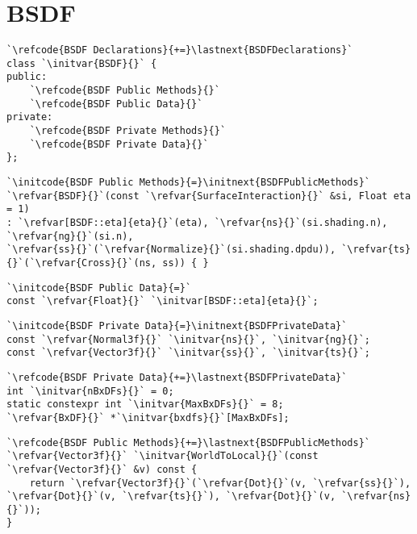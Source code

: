 \section{BSDF}\label{sec:BSDF}

\begin{lstlisting}
`\refcode{BSDF Declarations}{+=}\lastnext{BSDFDeclarations}`
class `\initvar{BSDF}{}` {
public:
    `\refcode{BSDF Public Methods}{}`
    `\refcode{BSDF Public Data}{}`
private:
    `\refcode{BSDF Private Methods}{}`
    `\refcode{BSDF Private Data}{}`
};
\end{lstlisting}

\begin{lstlisting}
`\initcode{BSDF Public Methods}{=}\initnext{BSDFPublicMethods}`
`\refvar{BSDF}{}`(const `\refvar{SurfaceInteraction}{}` &si, Float eta = 1)
: `\refvar[BSDF::eta]{eta}{}`(eta), `\refvar{ns}{}`(si.shading.n), `\refvar{ng}{}`(si.n),
`\refvar{ss}{}`(`\refvar{Normalize}{}`(si.shading.dpdu)), `\refvar{ts}{}`(`\refvar{Cross}{}`(ns, ss)) { }
\end{lstlisting}

\begin{lstlisting}
`\initcode{BSDF Public Data}{=}`
const `\refvar{Float}{}` `\initvar[BSDF::eta]{eta}{}`;
\end{lstlisting}

\begin{lstlisting}
`\initcode{BSDF Private Data}{=}\initnext{BSDFPrivateData}`
const `\refvar{Normal3f}{}` `\initvar{ns}{}`, `\initvar{ng}{}`;
const `\refvar{Vector3f}{}` `\initvar{ss}{}`, `\initvar{ts}{}`;
\end{lstlisting}

\begin{lstlisting}
`\refcode{BSDF Private Data}{+=}\lastnext{BSDFPrivateData}`
int `\initvar{nBxDFs}{}` = 0;
static constexpr int `\initvar{MaxBxDFs}{}` = 8;
`\refvar{BxDF}{}` *`\initvar{bxdfs}{}`[MaxBxDFs];
\end{lstlisting}

\begin{lstlisting}
`\refcode{BSDF Public Methods}{+=}\lastnext{BSDFPublicMethods}`
`\refvar{Vector3f}{}` `\initvar{WorldToLocal}{}`(const `\refvar{Vector3f}{}` &v) const {
    return `\refvar{Vector3f}{}`(`\refvar{Dot}{}`(v, `\refvar{ss}{}`), `\refvar{Dot}{}`(v, `\refvar{ts}{}`), `\refvar{Dot}{}`(v, `\refvar{ns}{}`));
}
\end{lstlisting}

